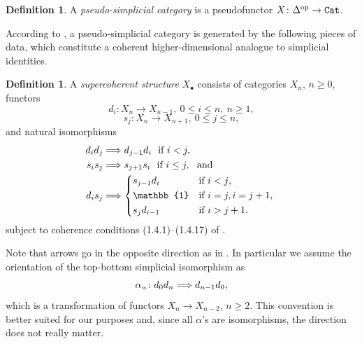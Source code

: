 \documentclass[12pt,leqno]{amsart}
\theoremstyle{definition}
\newtheorem{definition}[theorem]{Definition}
\def\amix{\alpha_{\scriptscriptstyle{\it{m}}}}
\newcommand{\Cat}{{\tt Cat}}
\newcommand{\uu}{\mathbb{1}}
\newcommand{\4}{\texttt{4}}
\DeclareMathOperator{\op}{op}
\begin{document}
\begin{definition}
    A \textit{pseudo-simplicial category} is a pseudofunctor $X\colon\Delta^{\op}\to \Cat$.
\end{definition}
According to \cite{Jardine}, a pseudo-simplicial category is generated
by the following pieces of data, which constitute a coherent 
higher-dimensional analogue to simplicial identities.
\begin{definition}
\label{definition:almost strict supercoherent}
A \textit{supercoherent structure} $X_\bullet$ consists of
categories $X_n$, $n \geq 0$, functors $$d_i : X_n\to X_{n-1}, \ 0 \leq
i \leq n, \ n \geq 1,$$
$$s_j : X_n \to X_{n+1}, \ 0 \leq j \leq n,$$
and natural isomorphisms
\begin{subequations}
\label{Jaruska upekla vybornou buchtu.}
\label{equation:simplicial identities}
\begin{align}
\label{hromada uhli}
d_id_j  &\Longrightarrow d_{j-1}d_i \ \ \text{if } i < j,
\\
\label{simpl ids with s} s_is_j  &\Longrightarrow s_{j+1}s_{i} \ \ \text{if } i \leq j, \ \hbox { and}
\\
\label{simpl ids combined} d_i s_j &\Longrightarrow
  \begin{cases*}
s_{j-1}  d_i   &  if $i < j$,  \\
\uu & if $i = j, i=j+1,$ \\ 
      s_j d_{i-1} &  if $i > j+1$. 
\end{cases*}
\end{align}
\end{subequations}
subject to coherence conditions (1.4.1)--(1.4.17) of \cite{Jardine}.
\end{definition}
Note that arrows go in the opposite direction as in \cite{Jardine}. In
particular we assume the orientation of the top-bottom simplicial
isomorphism as 
\begin{equation}
\label{Koupani v Dalesicke prehrade - zavidim.}
\amix\colon d_0d_n \Longrightarrow d_{n-1}d_0,
\end{equation}
which is a transformation of functors $X_n\to X_{n-2}$, $n\geq
2$. This convention is better suited for our purposes and, since all $\alpha$'s are isomorphisms, the direction does not really matter.
\end{document}
